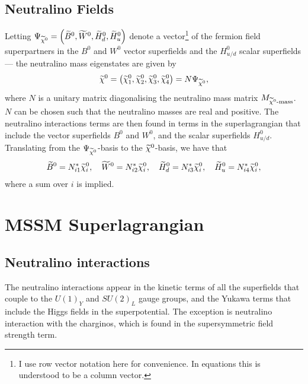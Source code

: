 \documentclass[english, notitlepage]{article}
\begin{document}
    \subsection{Neutralino Fields}
        Letting $\Psi_{\nino} = \pclosed{\bino, \wino, \hinod, \hinou}$ denote a vector\footnote{I use row vector notation here for convenience.
            In equations this is understood to be a column vector.}
        of the fermion field superpartners in the $B^0$ and $W^0$ vector superfields and the $H^0_{u/d}$ scalar superfields --- the neutralino mass eigenstates are given by
        \begin{align}
            \nino = \pclosed{\nino[1], \nino[2], \nino[3], \nino[4]} = N \Psi_{\nino},
        \end{align}
        where $N$ is a unitary matrix diagonalising the neutralino mass matrix $M_{\nino\text{-mass}}$.
        \(N\) can be chosen such that the neutralino masses are real and positive.
        The neutralino interactions terms are then found in terms in the superlagrangian that include the vector superfields $B^0$ and $W^0$, and the scalar superfields $H^0_{u/d}$.
        Translating from the $\Psi_{\nino}$-basis to the $\nino$-basis, we have that
        \begin{align}
            \bino = N_{i1}^* \nino[i],\quad \wino = N_{i2}^* \nino[i],\quad \hinod = N_{i3}^* \nino[i],\quad \hinou = N_{i4}^* \nino[i],
        \end{align}
        where a sum over $i$ is implied.

\section{MSSM Superlagrangian}

    \subsection{Neutralino interactions}
        The neutralino interactions appear in the kinetic terms of all the superfields
        that couple to the $U(1)_Y$ and $SU(2)_L$ gauge groups, and the Yukawa terms
        that include the Higgs fields in the superpotential.
        The exception is neutralino interaction with the charginos, which is found in the supersymmetric field strength term.
\end{document}
